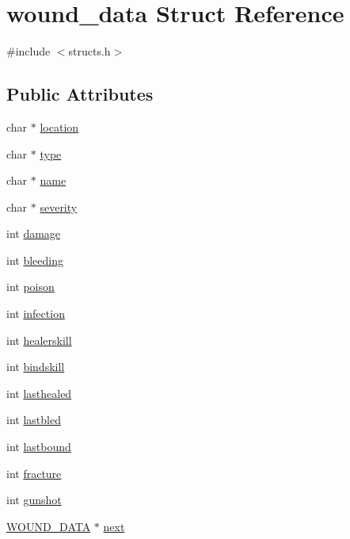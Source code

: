 \hypertarget{structwound__data}{\section{wound\-\_\-data Struct Reference}
\label{structwound__data}
}


{\ttfamily \#include $<$structs.\-h$>$}

\subsection*{Public Attributes}
\begin{DoxyCompactItemize}
\item 
char $\ast$ \hyperlink{structwound__data_a2be5f7c5b4eb38dbb6bb79af189c655c}{location}
\item 
char $\ast$ \hyperlink{structwound__data_a4e948e084dc2302ff639487fd52efff1}{type}
\item 
char $\ast$ \hyperlink{structwound__data_ae70e3e3fb9e71ac3a53fc0cc57a3770c}{name}
\item 
char $\ast$ \hyperlink{structwound__data_aa16c2ce2d57f9e2d99d8d1de805e5610}{severity}
\item 
int \hyperlink{structwound__data_aa6f172445dca229d7781f4dfdc895050}{damage}
\item 
int \hyperlink{structwound__data_a59a84f83cfb4885e6e9bb2782265b100}{bleeding}
\item 
int \hyperlink{structwound__data_afaac7fc7d77e319662551ac5203812a4}{poison}
\item 
int \hyperlink{structwound__data_aa1b6d71d3730dd8f645c9bedd193fabe}{infection}
\item 
int \hyperlink{structwound__data_a7d4f9e5da9b43e9c8c853331e1ce4265}{healerskill}
\item 
int \hyperlink{structwound__data_a5125718894a9abf21860c54d2cc72549}{bindskill}
\item 
int \hyperlink{structwound__data_a1ab905e77555a860ba18fe5989ed7324}{lasthealed}
\item 
int \hyperlink{structwound__data_a588ef2d4af6aa25b0f261d647dbee9f8}{lastbled}
\item 
int \hyperlink{structwound__data_aafcdf74603ffe58b8c6b6f6ac37d6fc1}{lastbound}
\item 
int \hyperlink{structwound__data_a6df02e8d8a22003c56b69d4ed5200bf6}{fracture}
\item 
int \hyperlink{structwound__data_a29aecddb9188f1fcbe5d911608cc7a42}{gunshot}
\item 
\hyperlink{structs_8h_acd99076446b10c8cfc2d23d4bfc40211}{W\-O\-U\-N\-D\-\_\-\-D\-A\-T\-A} $\ast$ \hyperlink{structwound__data_ae32ec87ea6c38e7cd0cf1b210005d46d}{next}
\end{DoxyCompactItemize}


